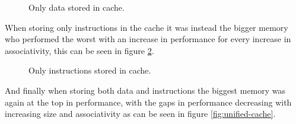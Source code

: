 \documentclass[titlepage, a4paper]{article}
\begin{document}
\begin{figure}[H]
	\centering
	\caption{Only data stored in cache.}
	\label{fig:data-cache}
\end{figure}

When storing only instructions in the cache it was instead the bigger memory who performed the worst with an increase in performance for every increase in associativity, this can be seen in figure \ref{fig:instruction-cache}.

\begin{figure}[H]
	\centering
	\caption{Only instructions stored in cache.}
	\label{fig:instruction-cache}
\end{figure}

And finally when storing both data and instructions the biggest memory was again at the top in performance, with the gaps in performance decreasing with increasing size and associativity as can be seen in figure \ref{fig:unified-cache}.
\end{document}
